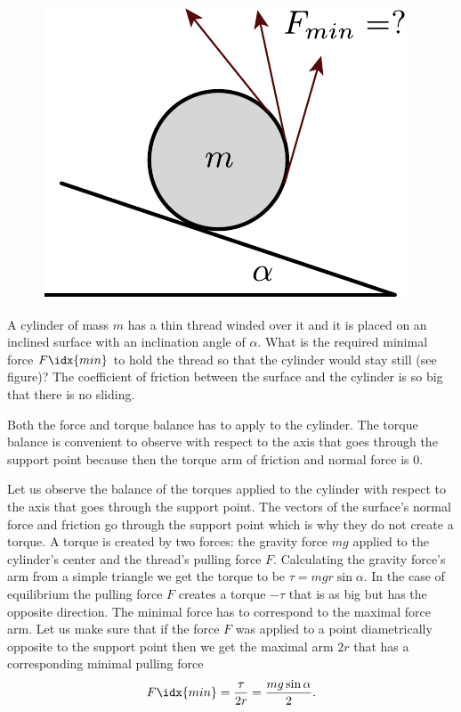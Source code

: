 \begin{figure}
\vspace{-15pt}
\includegraphics[width=\linewidth]{2013-lahg-08-joonis_niidirull-crop}
\end{figure}
A cylinder of mass $m$ has a thin thread winded over it and it is placed on an inclined surface with an inclination angle of $\alpha$. What is the required minimal force $F\idx{min}$ to hold the thread so that the cylinder would stay still (see figure)? The coefficient of friction between the surface and the cylinder is so big that there is no sliding.

\hinteng
Both the force and torque balance has to apply to the cylinder. The torque balance is convenient to observe with respect to the axis that goes through the support point because then the torque arm of friction and normal force is 0.

\solueng
Let us observe the balance of the torques applied to the cylinder with respect to the axis that goes through the support point. The vectors of the surface’s normal force and friction go through the support point which is why they do not create a torque. A torque is created by two forces: the gravity force $mg$ applied to the cylinder’s center and the thread’s pulling force $F$. Calculating the gravity force’s arm from a simple triangle we get the torque to be $\tau=mgr\sin\alpha$. In the case of equilibrium the pulling force $F$ creates a torque $-\tau$ that is as big but has the opposite direction. The minimal force has to correspond to the maximal force arm. Let us make sure that if the force $F$ was applied to a point diametrically opposite to the support point then we get the maximal arm $2r$ that has a corresponding minimal pulling force
\[F\idx{min}=\frac{\tau}{2r}=\frac{mg\sin\alpha}{2}.\]
\probend